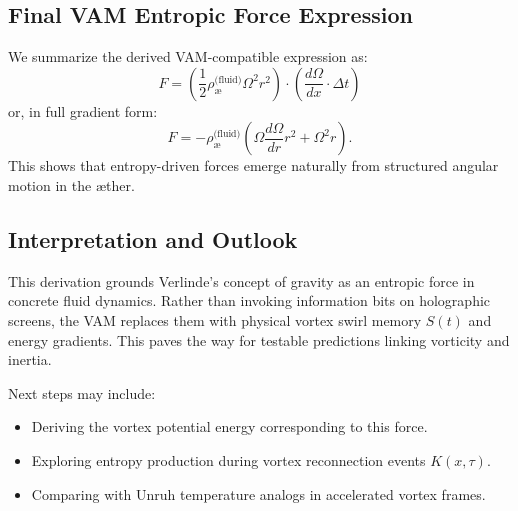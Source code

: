 \documentclass[12pt]{article}
\begin{document}
            \subsection{Final VAM Entropic Force Expression}

            We summarize the derived VAM-compatible expression as:
            \begin{equation}
                F = \left( \frac{1}{2} \rho_{\text{\ae}}^{\text{(fluid)}} \Omega^2 r^2 \right) \cdot \left( \frac{d\Omega}{dx} \cdot \Delta t \right)
            \end{equation}
            or, in full gradient form:
            \begin{equation}
                F = -\rho_{\text{\ae}}^{\text{(fluid)}} \left( \Omega \frac{d\Omega}{dr} r^2 + \Omega^2 r \right).
            \end{equation}
            This shows that entropy-driven forces emerge naturally from structured angular motion in the æther.

            \subsection*{Interpretation and Outlook}

            This derivation grounds Verlinde's concept of gravity as an entropic force in concrete fluid dynamics. Rather than invoking information bits on holographic screens, the VAM replaces them with physical vortex swirl memory $S(t)$ and energy gradients. This paves the way for testable predictions linking vorticity and inertia.

            Next steps may include:
            \begin{itemize}
            \item Deriving the vortex potential energy corresponding to this force.
                \item Exploring entropy production during vortex reconnection events $K(x, \tau)$.
            \item Comparing with Unruh temperature analogs in accelerated vortex frames.
            \end{itemize}
\end{document}
